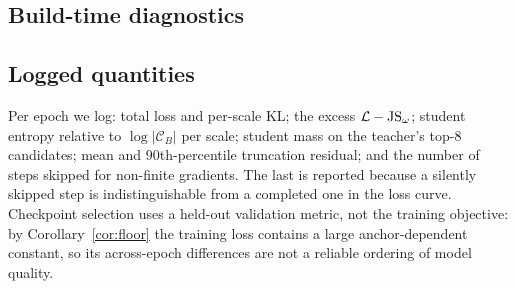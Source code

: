 \subsection{Build-time diagnostics}
\label{app:diag}



\subsection{Logged quantities}

Per epoch we log: total loss and per-scale KL; the excess $\mathcal{L}-\mathrm{JS}_\omega$; student
entropy relative to $\log|\mathcal{C}_B|$ per scale; student mass on the teacher's top-$8$
candidates; mean and $90$th-percentile truncation residual; and the number of steps skipped
for non-finite gradients. The last is reported because a silently skipped step is
indistinguishable from a completed one in the loss curve. Checkpoint selection uses a
held-out validation metric, not the training objective: by Corollary~\ref{cor:floor} the
training loss contains a large anchor-dependent constant, so its across-epoch differences
are not a reliable ordering of model quality.
